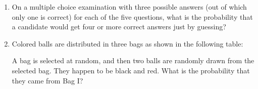 \begin{enumerate}   
\item On a multiple choice examination with three possible answers (out of which only one is correct) for each of the five questions, what is the probability that a candidate would get four or more correct answers just by guessing?  

\item Colored balls are distributed in three bags as shown in the following table:

\begin{table}[h]                                                         
\centering
{}                                               
\end{table}

A bag is selected at random, and then two balls are randomly drawn from the selected bag. They happen to be black and red. What is the probability that they came from Bag I?

\end{enumerate}
